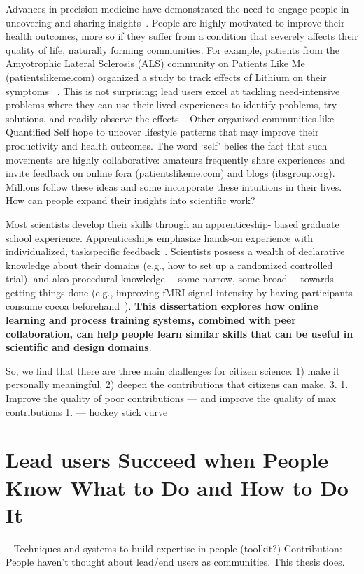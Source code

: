 Advances in precision medicine have demonstrated the need
to engage people in uncovering and sharing insights~\cite{Aronson2015}. People
are highly motivated to improve their health outcomes,
more so if they suffer from a condition that severely affects
their quality of life, naturally forming communities. For example,
patients from the Amyotrophic Lateral Sclerosis
(ALS) community on Patients Like Me (patientslikeme.com)
organized a study to track effects of Lithium on their symptoms
~\cite{Wicks2011}. This is not surprising; lead users excel at tackling
need-intensive problems where they can use their lived
experiences to identify problems, try solutions, and readily
observe the effects~\cite{VonHippel2005}. Other organized communities like
Quantified Self hope to uncover lifestyle patterns that may
improve their productivity and health outcomes. The word
‘self’ belies the fact that such movements are highly collaborative:
amateurs frequently share experiences and invite
feedback on online fora (patientslikeme.com) and blogs
(ibsgroup.org). Millions follow these ideas and some incorporate
these intuitions in their lives. How can people expand
their insights into scientific work?

Most scientists develop their skills through an apprenticeship-
based graduate school experience. Apprenticeships emphasize
hands-on experience with individualized, taskspecific
feedback~\cite{schon1984reflective}. Scientists possess a wealth of declarative
knowledge about their domains (e.g., how to set up a
randomized controlled trial), and also procedural knowledge
—some narrow, some broad —towards getting things done
(e.g., improving fMRI signal intensity by having participants
consume cocoa beforehand~\cite{Francis2006}). \textbf{This dissertation explores how
online learning and process training systems, combined with
peer collaboration, can help people learn similar skills that
can be useful in scientific and design domains}.

So, we find that there are three main challenges for citizen science: 1) make it personally meaningful, 2) deepen the contributions that citizens can make.
3. 1. Improve the quality of poor contributions — and improve the quality of max contributions 
    1. — hockey stick curve 

\section{Lead users Succeed when People Know What to Do and How to Do It}
-- Techniques and systems to build expertise in people (toolkit?)
Contribution: People haven't thought about lead/end users as communities. This thesis does.

